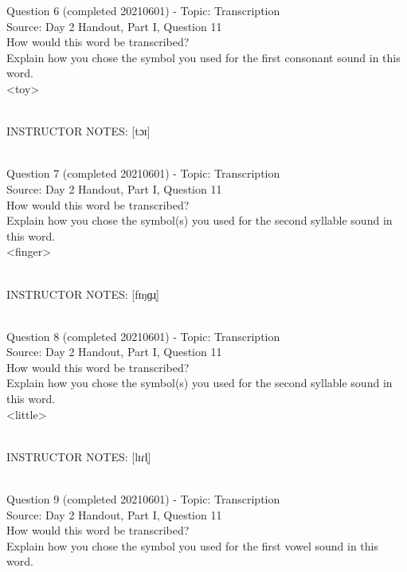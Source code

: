 \documentclass[12pt]{article}
\begin{document}
{\large Question 6} (completed 20210601) - Topic: Transcription\\
Source: Day 2 Handout, Part I, Question 11\\

How would this word be transcribed?\\ Explain how you chose the symbol you used for the first consonant sound in this word.\\

<toy>


~\\
INSTRUCTOR NOTES: [tɔɪ]


~\\

{\large Question 7} (completed 20210601) - Topic: Transcription\\
Source: Day 2 Handout, Part I, Question 11\\

How would this word be transcribed?\\ Explain how you chose the symbol(s) you used for the second syllable sound in this word.\\

<finger>


~\\
INSTRUCTOR NOTES: [fɪŋɡɹ̩]


~\\

{\large Question 8} (completed 20210601) - Topic: Transcription\\
Source: Day 2 Handout, Part I, Question 11\\

How would this word be transcribed?\\ Explain how you chose the symbol(s) you used for the second syllable sound in this word.\\

<little>


~\\
INSTRUCTOR NOTES: [lɪɾl̩]


~\\

{\large Question 9} (completed 20210601) - Topic: Transcription\\
Source: Day 2 Handout, Part I, Question 11\\

How would this word be transcribed?\\ Explain how you chose the symbol you used for the first vowel sound in this word.\\
\end{document}
